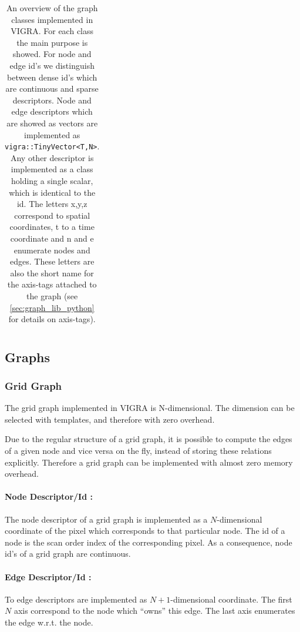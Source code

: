 \begin{table}
\begin{tiny}
\begin{tabular}{|l|p{1.5cm}|p{0.5cm}|p{0.5cm}|p{0.6cm}|p{0.6cm}|p{0.6cm}|p{0.8cm}|p{0.8cm}|l|l|l|}
\end{tabular}
\end{tiny}
\caption[VIGRA's graph classes]{
    An overview of the graph classes implemented in VIGRA.
    For each class the main purpose is showed.
    For node and edge id's we distinguish between dense id's
    which are continuous and sparse descriptors.
    Node and edge descriptors which are showed as vectors 
    are implemented as \lstinline{vigra::TinyVector<T,N>}.
    Any other descriptor is implemented as a class holding
    a single scalar, which is identical to the id.
    The letters x,y,z correspond to spatial coordinates, t to a time coordinate
    and n and e enumerate nodes and edges.
    These letters are also the short name for the axis-tags attached to the
    graph (see \cref{sec:graph_lib_python} for details on axis-tags).
}
\end{table}


\subsection{Graphs} \label{sec:impl_graphs}

\subsubsection{Grid Graph} \label{sec:graphs_grid_graph}

The grid graph implemented in VIGRA is N-dimensional.
The dimension can be selected with templates, and therefore with zero
overhead.

Due to the regular structure of a grid graph, it is possible to compute the edges of a given 
node and vice versa on the fly, instead of storing these relations explicitly.
Therefore a grid graph can be implemented with almost zero memory overhead.

\paragraph{Node Descriptor/Id :}
The node descriptor of a grid graph is implemented as a
$N$-dimensional coordinate of the pixel which corresponds to
that particular node. The id of a node is the scan order index
of the corresponding pixel.
As a consequence, node id's of a grid graph are continuous.
\paragraph{Edge Descriptor/Id :}
To edge descriptors are implemented as $N+1$-dimensional coordinate.
The first $N$ axis correspond to the node which ``owns'' this edge.
The last axis enumerates the edge w.r.t. the node.

